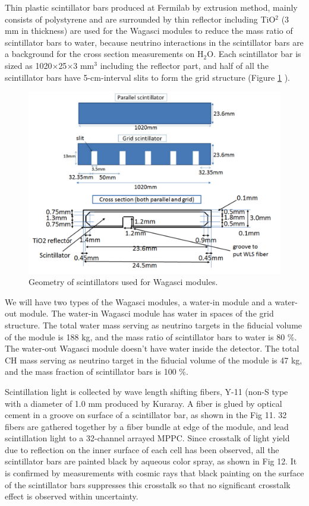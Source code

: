 Thin plastic scintillator bars produced at Fermilab by extrusion method, mainly consists of polystyrene and are surrounded by thin reflector including TiO$^{2}$ (3 mm in thickness) are used for the Wagasci modules to reduce the mass ratio of scintillator bars to water,
because neutrino interactions in the scintillator bars are a background for the cross section measurements on H$_{2}$O.
Each scintillator bar is sized as 1020$\times$25$\times$3 mm$^{3}$ including the reflector part, and 
half of all the scintillator bars have 5-cm-interval slits to form the grid structure (Figure \ref{fig:wagasci_scinti_geometry} ). 

\begin{figure}[tbh]
\begin{center}
\includegraphics[width=0.8\linewidth]{fig/wagasci_scinti_geometry.pdf}
\end{center}
\caption{
Geometry of scintillators used for Wagasci modules.
}
\label{fig:wagasci_scinti_geometry}
\end{figure}


We will have two types of the Wagasci modules, a water-in module and a water-out module.
The water-in Wagasci module has water in spaces of the grid structure.
The total water mass serving as neutrino targets in the fiducial volume of the module is 188 kg,
and the mass ratio of scintillator bars to water is 80 \%.
The water-out Wagasci module doesn't have water inside the detector.
The total CH mass serving as neutrino target in the fiducial volume of the module is 47 kg,
and the mass fraction of scintillator bars is 100 \%.


Scintillation light is collected by wave length shifting fibers, Y-11 (non-S type  with a diameter of 1.0 mm produced by Kuraray. A fiber is glued by optical cement in a groove on surface of a scintillator bar, as shown in the Fig 11. 32 fibers are gathered together by a fiber bundle at edge of the module, and lead scintillation light to a 32-channel arrayed MPPC.
Since crosstalk of light yield due to reflection on the inner surface of each cell has been observed, all the scintillator bars are painted black by aqueous color spray, as shown in Fig 12. It is confirmed by measurements with cosmic rays that black painting on the surface of the scintillator bars suppresses this crosstalk so that no significant crosstalk effect is observed within uncertainty.


